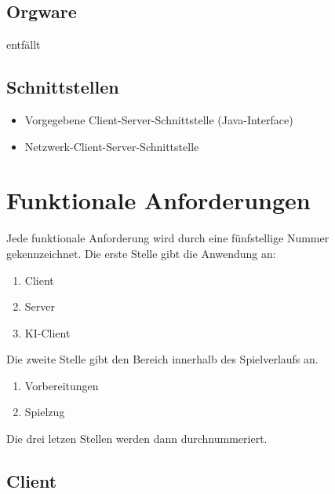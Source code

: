 \documentclass[a4paper,10pt]{article}
\begin{document}
\subsection{Orgware}
entfällt
\subsection{Schnittstellen}
\begin{itemize}
\item Vorgegebene Client-Server-Schnittstelle (Java-Interface)
\item Netzwerk-Client-Server-Schnittstelle
\end{itemize}
\section{Funktionale Anforderungen}
Jede funktionale Anforderung wird durch eine fünfstellige Nummer gekennzeichnet. Die erste Stelle gibt die Anwendung an:
\begin{enumerate}
\item Client
\item Server
\item KI-Client
\end{enumerate}
Die zweite Stelle gibt den Bereich innerhalb des Spielverlaufs an.
\begin{enumerate}
\item Vorbereitungen
\item Spielzug
\end{enumerate}
Die drei letzen Stellen werden dann durchnummeriert.
\subsection{Client}
\end{document}
